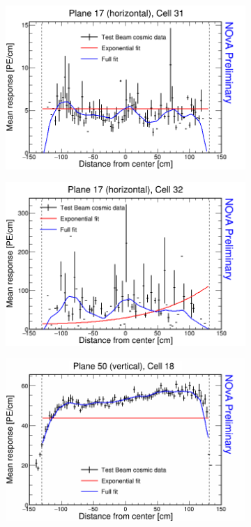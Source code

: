 \begin{figure}[h]
  \begin{subfigure}{0.495\textwidth}
    \includegraphics[width=\linewidth]{Plots/RelativeCalibrationResults/ep3de_017_031.png}
  \end{subfigure}
  \begin{subfigure}{0.495\textwidth}
    \includegraphics[width=\linewidth]{Plots/RelativeCalibrationResults/ep3de_017_032.png}
  \end{subfigure}
  \begin{subfigure}{0.495\textwidth}
    \includegraphics[width=\linewidth]{Plots/RelativeCalibrationResults/ep3de_050_018.png}

\end{subfigure}
\end{figure}
